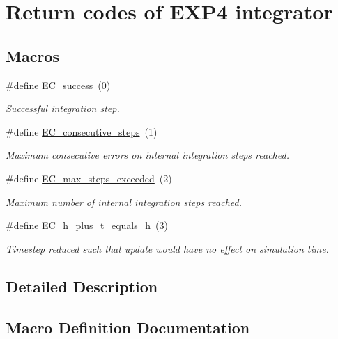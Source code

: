 \hypertarget{group__exp4__ErrCodes}{}\section{Return codes of E\+X\+P4 integrator}
\label{group__exp4__ErrCodes}
\subsection*{Macros}
\begin{DoxyCompactItemize}
\item 
\#define \hyperlink{group__exp4__ErrCodes_gabd83bc0f9f475a2189a4db4a08b790ca}{E\+C\+\_\+success}~(0)
\begin{DoxyCompactList}\small\item\em Successful integration step. \end{DoxyCompactList}\item 
\#define \hyperlink{group__exp4__ErrCodes_gae0287841c08f86f5709660fd731615ad}{E\+C\+\_\+consecutive\+\_\+steps}~(1)
\begin{DoxyCompactList}\small\item\em Maximum consecutive errors on internal integration steps reached. \end{DoxyCompactList}\item 
\#define \hyperlink{group__exp4__ErrCodes_ga0f0275d9851ab5c19b79a963d5084df3}{E\+C\+\_\+max\+\_\+steps\+\_\+exceeded}~(2)
\begin{DoxyCompactList}\small\item\em Maximum number of internal integration steps reached. \end{DoxyCompactList}\item 
\#define \hyperlink{group__exp4__ErrCodes_ga9326efd544880e2683c4453365ca2704}{E\+C\+\_\+h\+\_\+plus\+\_\+t\+\_\+equals\+\_\+h}~(3)
\begin{DoxyCompactList}\small\item\em Timestep reduced such that update would have no effect on simulation time. \end{DoxyCompactList}\end{DoxyCompactItemize}


\subsection{Detailed Description}


\subsection{Macro Definition Documentation}
